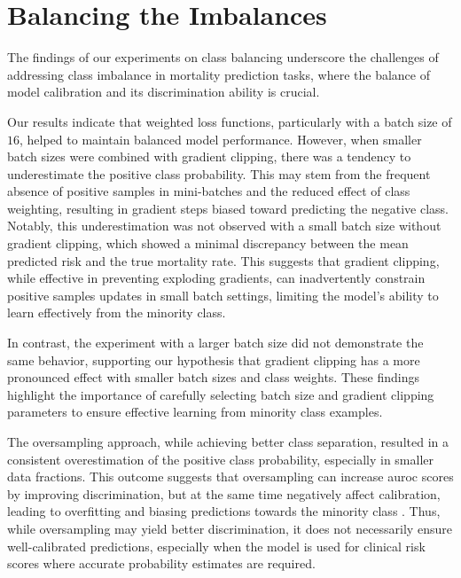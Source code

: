 \section{Balancing the Imbalances}

The findings of our experiments on class balancing underscore the challenges of addressing class imbalance in mortality prediction tasks, where the balance of model calibration and its discrimination ability is crucial.

Our results indicate that weighted loss functions, particularly with a batch size of \(16\), helped to maintain balanced model performance. However, when smaller batch sizes were combined with gradient clipping, there was a tendency to underestimate the positive class probability. This may stem from the frequent absence of positive samples in mini-batches and the reduced effect of class weighting, resulting in gradient steps biased toward predicting the negative class. Notably, this underestimation was not observed with a small batch size without gradient clipping, which showed a minimal discrepancy between the mean predicted risk and the true mortality rate. This suggests that gradient clipping, while effective in preventing exploding gradients, can inadvertently constrain positive samples updates in small batch settings, limiting the model’s ability to learn effectively from the minority class.


In contrast, the experiment with a larger batch size did not demonstrate the same behavior, supporting our hypothesis that gradient clipping has a more pronounced effect with smaller batch sizes and class weights. These findings highlight the importance of carefully selecting batch size and gradient clipping parameters to ensure effective learning from minority class examples.


The oversampling approach, while achieving better class separation, resulted in a consistent overestimation of the positive class probability, especially in smaller data fractions. This outcome suggests that oversampling can increase \gls{auroc} scores by improving discrimination, but at the same time negatively affect calibration, leading to overfitting and biasing predictions towards the minority class \cite[][13]{Weiss2004Mining}. Thus, while oversampling may yield better discrimination, it does not necessarily ensure well-calibrated predictions, especially when the model is used for clinical risk scores where accurate probability estimates are required.

